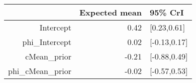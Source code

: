 \begin{tabular}{rrl}
  \hline
 & Expected mean & 95\% CrI \\ 
  \hline
Intercept & 0.42 & [0.23,0.61] \\ 
  phi\_Intercept & 0.02 & [-0.13,0.17] \\ 
  cMean\_prior & -0.21 & [-0.88,0.49] \\ 
  phi\_cMean\_prior & -0.02 & [-0.57,0.53] \\ 
   \hline
\end{tabular}

